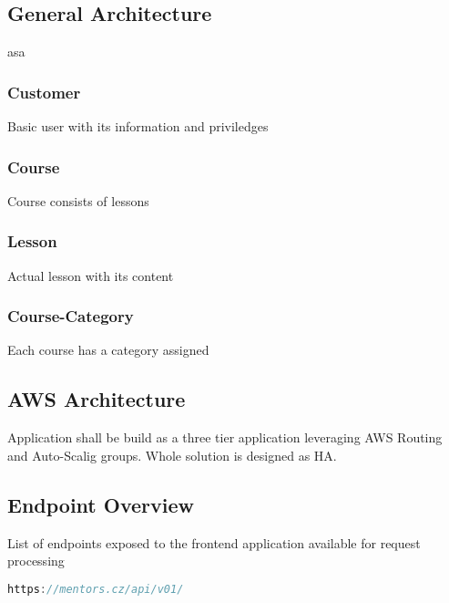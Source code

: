 \documentclass{article}
\begin{document}
\subsection{General Architecture}
asa
\subsubsection{Customer}
Basic user with its information and priviledges
\subsubsection{Course}
Course consists of lessons
\subsubsection{Lesson}
Actual lesson with its content
\subsubsection{Course-Category}
Each course has a category assigned

\subsection{AWS Architecture}
Application shall be build as a three tier application leveraging AWS Routing and Auto-Scalig groups. Whole solution is designed as HA.

\subsection{Endpoint Overview}
List of endpoints exposed to the frontend application available for request processing

\begin{lstlisting}[language=Java, caption=Backend Application base path]
        https://mentors.cz/api/v01/
\end{lstlisting}
\end{document}

